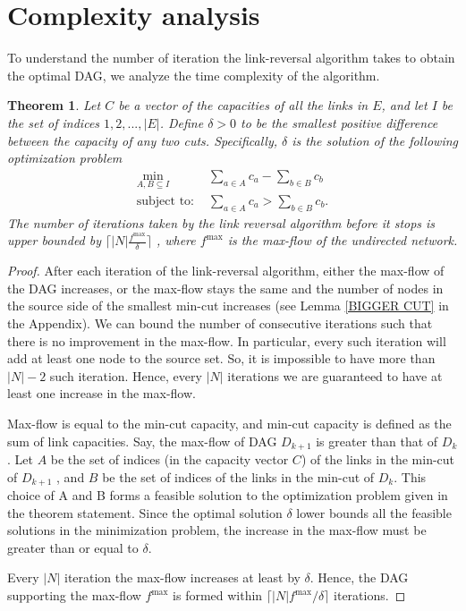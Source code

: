\documentclass{sig-alternate-2013}
\newtheorem{theorem}{Theorem}
\begin{document}
\section{Complexity analysis} \label{sec:complexity}
To understand the number of iteration the link-reversal algorithm takes to obtain the optimal DAG, we analyze the time complexity of the algorithm. 
\begin{theorem}\label{thm:complexity}
Let $C$ be a vector of  the capacities of all the links in $E$, and let $I$ be the set of indices $1,2,..., |E|$.  Define $\delta > 0$ to be the smallest positive difference between the capacity of any two cuts. Specifically, $\delta$ is the solution  of the following optimization problem
\begin{align*}
\min _{A,B\subseteq I} &\sum_{a\in A} c_a-\sum_{b \in B}c_b\\
\text{subject to: } &\sum_{a\in A} c_a>\sum_{b \in B}c_b.
\end{align*}
The number of iterations taken by the link reversal algorithm before it stops is upper bounded by $\lceil|N| \frac{f^{\max}}{\delta} \rceil$ , where $f^{\max}$ is the max-flow of the undirected network.
\end{theorem}
\begin{proof}
After each iteration of the link-reversal algorithm, either the max-flow of the DAG  increases, or the max-flow stays the same and the number of nodes in the source side of the smallest min-cut increases (see Lemma \ref{BIGGER CUT} in the Appendix). We can bound the number of consecutive iterations such that there is no improvement in the max-flow. In particular, every such iteration will add at least one node to the source set. So, it is impossible to have more than $|N|-2$ such iteration. Hence, every $|N|$ iterations we are guaranteed to have at least one increase in the max-flow.

Max-flow is equal to the min-cut capacity, and min-cut capacity is defined as the sum of link capacities. Say, the max-flow of DAG $D_{k+1}$ is greater than that of $D_k$. Let $A$ be the set of indices (in the capacity vector $C$) of the links  in the min-cut of $D_{k+1}$ , and $B$ be the set of indices of the links in the min-cut of $D_{k}$. This choice of A and B forms a feasible solution to the optimization problem given in the theorem statement. Since the optimal solution $\delta$ lower bounds all the feasible solutions in the minimization problem, the increase in the max-flow must be greater than or equal to $\delta$. 

Every $|N|$ iteration the max-flow increases at least by $\delta$. Hence, the DAG supporting the max-flow $f^{\max}$ is formed within $\lceil|N| f^{\max}/\delta \rceil$ iterations.
\end{proof}
\end{document}
